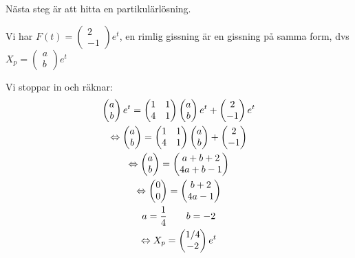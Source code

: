 \par\bigskip
\noindent Nästa steg är att hitta en partikulärlösning.\par
\noindent Vi har $F(t) = \begin{pmatrix}2\\-1\end{pmatrix}e^{t}$, en rimlig gissning är en gissning på samma form, dvs $X_p = \begin{pmatrix}a\\b\end{pmatrix}e^t$\par
\noindent Vi stoppar in och räknar:
\begin{equation*}
  \begin{gathered}
    \begin{pmatrix}a\\b\end{pmatrix}e^t=\begin{pmatrix}1&1\\4&1\end{pmatrix}\begin{pmatrix}a\\b\end{pmatrix}e^t+\begin{pmatrix}2\\-1\end{pmatrix}e^t\\
    \Leftrightarrow \begin{pmatrix}a\\b\end{pmatrix}=\begin{pmatrix}1&1\\4&1\end{pmatrix}\begin{pmatrix}a\\b\end{pmatrix}+\begin{pmatrix}2\\-1\end{pmatrix}\\
    \Leftrightarrow \begin{pmatrix}a\\b\end{pmatrix} = \begin{pmatrix}a+b+2\\4a+b-1\end{pmatrix}\\
    \Leftrightarrow \begin{pmatrix}0\\0\end{pmatrix} = \begin{pmatrix}b+2\\4a-1\end{pmatrix}\\
    a = \dfrac{1}{4}\qquad b=-2\\
    \Leftrightarrow X_p = \begin{pmatrix}1/4\\-2\end{pmatrix}e^t
  \end{gathered}
\end{equation*}\par
